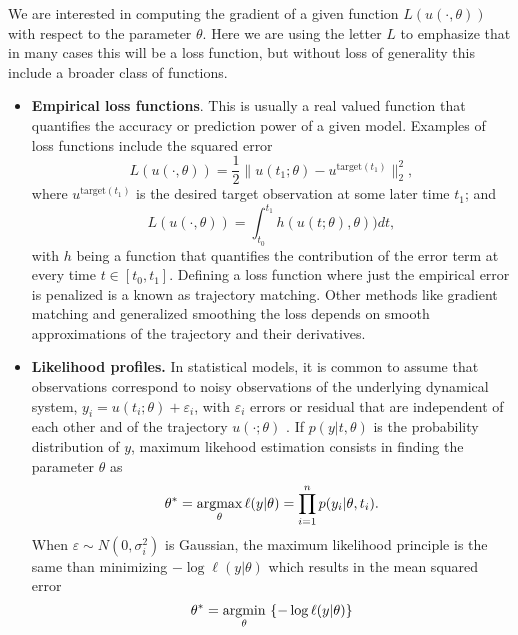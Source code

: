 We are interested in computing the gradient of a given function $L(u(\cdot, \theta))$ with respect to the parameter $\theta$.
Here we are using the letter $L$ to emphasize that in many cases this will be a loss function, but without loss of generality this include a broader class of functions. 
\begin{itemize}
    \item \textbf{Empirical loss functions}. This is usually a real valued function that quantifies the accuracy or prediction power of a given model. Examples of loss functions include the squared error
    \begin{equation}
     L(u(\cdot, \theta)) = \frac{1}{2} \| u(t_1; \theta) - u^{\text{target}(t_1)} \|_2^2,
     \label{eq:quadratic-loss-function}
    \end{equation}
    where $u^{\text{target}(t_1)}$ is the desired target observation at some later time $t_1$; and
    \begin{equation}
     L(u(\cdot, \theta)) = \int_{t_0}^{t_1} h( u(t;\theta), \theta) ) dt, 
    \end{equation}
    with $h$ being a function that quantifies the contribution of the error term at every time $t \in [t_0, t_1]$. 
    Defining a loss function where just the empirical error is penalized is a known as trajectory matching. 
    Other methods like gradient matching and generalized smoothing the loss depends on smooth approximations of the trajectory and their derivatives. 
    \item \textbf{Likelihood profiles.} In statistical models, it is common to assume that observations correspond to noisy observations of the underlying dynamical system, $y_i = u(t_i; \theta) + \varepsilon_i$, with $\varepsilon_i$ errors or residual that are independent of each other and of the trajectory $u(\cdot ; \theta)$ \cite{ramsay2017dynamic}.
    If $p(y | t , \theta)$ is the probability distribution of $y$, maximum likehood estimation consists in finding the parameter $\theta$ as
    \begin{equation}
        \theta^* 
        = 
        \underset{\theta}{\text{argmax}} \, \ell (y | \theta) 
        = 
        \prod_{i=1}^n p(y_i | \theta, t_i) .
    \end{equation}
    When $\varepsilon \sim N(0, \sigma_i^2)$ is Gaussian, the maximum likelihood principle is the same than minimizing $- \log \ell(y | \theta)$ which results in the mean squared error
    \begin{equation}
        \theta^* 
        = 
        \argmin{\theta} \, \left \{ - \log \ell (y | \theta) \right \}

\end{equation}
\end{itemize}
